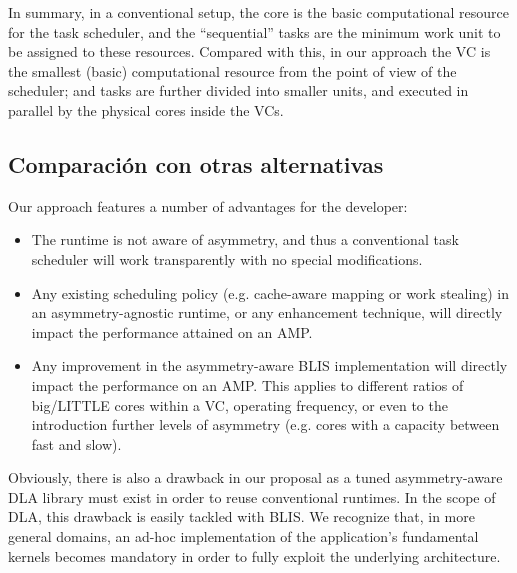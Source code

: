 In summary, in a conventional setup, the core is the basic computational resource for the task scheduler, 
and the ``sequential'' tasks are the minimum work unit to be assigned to these resources. Compared with this, in our approach the VC 
is the smallest (basic) computational resource from the point of view of the scheduler;
and tasks are further divided into smaller units, and executed in parallel by the physical cores inside the VCs.

\subsection{Comparación con otras alternativas}


Our approach features a number of advantages for the developer:
\begin{itemize}
\item The runtime is not aware of asymmetry, and thus a conventional task scheduler 
      will work transparently with no special modifications.
\item Any existing scheduling policy (e.g. cache-aware mapping or work stealing)
      in an asymmetry-agnostic runtime, or any enhancement technique, will directly impact the performance attained on an AMP.
\item Any improvement in the asymmetry-aware BLIS implementation will directly impact the performance on an AMP. 
      This applies to different ratios of big/LITTLE cores within a VC, operating frequency, or even to the introduction further levels
      of asymmetry (e.g. cores with a capacity between fast and slow).
\end{itemize}

Obviously, there is also a drawback in our proposal
as a tuned asymmetry-aware DLA library must exist in order to 
reuse conventional runtimes. 
In the scope of DLA, this drawback is easily tackled with BLIS. We recognize that, in more general domains, 
an ad-hoc implementation of the application's 
fundamental kernels becomes mandatory in order to fully exploit the underlying architecture.


